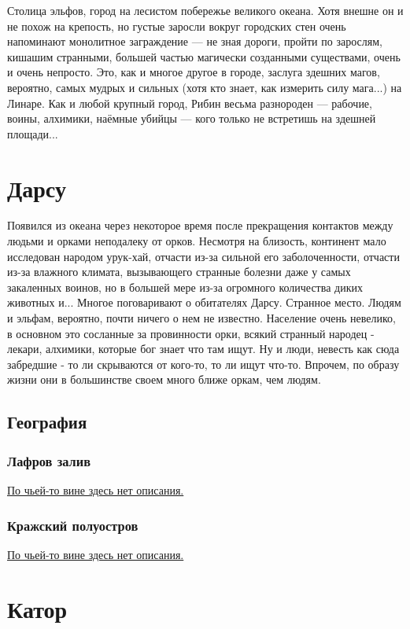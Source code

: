 \documentclass[12pt,a4paper]{book}
\begin{document}
Столица эльфов, город на лесистом побережье великого океана. Хотя внешне он и не похож на крепость, но густые заросли вокруг городских стен очень напоминают монолитное заграждение --- не зная дороги, пройти по зарослям, кишашим странными, большей частью магически созданными существами, очень и очень непросто. Это, как и многое другое в городе, заслуга здешних магов, вероятно, самых мудрых и сильных (хотя кто знает, как измерить силу мага...) на Линаре. Как и любой крупный город, Рибин весьма разнороден --- рабочие, воины, алхимики, наёмные убийцы --- кого только не встретишь на здешней площади...

\chapter{Дарсу}

Появился из океана через некоторое время после прекращения контактов между людьми и орками неподалеку от орков. Несмотря на близость, континент мало исследован народом урук-хай, отчасти из-за сильной его заболоченности, отчасти из-за влажного климата, вызывающего странные болезни даже у самых закаленных воинов, но в большей мере из-за огромного количества диких животных и... Многое поговаривают о обитателях Дарсу. Странное место. Людям и эльфам, вероятно, почти ничего о нем не известно. Население очень невелико, в основном это сосланные за провинности орки, всякий странный народец - лекари, алхимики, которые бог знает что там ищут. Ну и люди, невесть как сюда забредшие - то ли скрываются от кого-то, то ли ищут что-то. Впрочем, по образу жизни они в большинстве своем много ближе оркам, чем людям.

\section{География}

\subsection{Лафров залив}

\underline{По чьей-то вине здесь нет описания.}

\subsection{Кражский полуостров}

\underline{По чьей-то вине здесь нет описания.}

\chapter{Катор}
\end{document}
